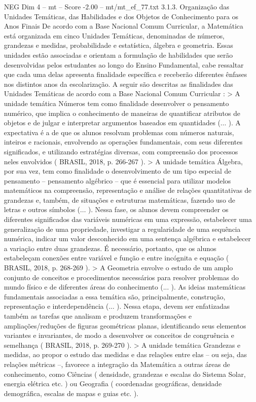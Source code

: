 \begin{textsample}{NEG Dim 4 – mt – Score -2.00 – mt/mt\_ef\_77.txt}  \label{ex:f4_neg_118}
3.1.3.
Organização das Unidades Temáticas, das Habilidades e dos Objetos de Conhecimento para os Anos Finais De acordo com a Base Nacional Comum Curricular, a Matemática está organizada em cinco Unidades Temáticas, denominadas de números, grandezas e medidas, probabilidade e estatística, álgebra e geometria.
Essas unidades estão associadas e orientam a formulação de habilidades que serão desenvolvidas pelos estudantes ao longo do Ensino Fundamental, cabe ressaltar que cada uma delas apresenta finalidade específica e receberão diferentes ênfases nos distintos anos da escolarização.
A seguir são descritas as finalidades das Unidades Temáticas de acordo com a Base Nacional Comum Curricular : > A unidade temática Números tem como finalidade desenvolver o pensamento numérico, que implica o conhecimento de maneiras de quantificar atributos de objetos e de julgar e interpretar argumentos baseados em quantidades (... ).
A expectativa é a de que os alunos resolvam problemas com números naturais, inteiros e racionais, envolvendo as operações fundamentais, com seus diferentes significados, e utilizando estratégias diversas, com compreensão dos processos neles envolvidos ( BRASIL, 2018, p. 266-267 ). > A unidade temática Álgebra, por sua vez, tem como finalidade o desenvolvimento de um tipo especial de pensamento – pensamento algébrico – que é essencial para utilizar modelos matemáticos na compreensão, representação e análise de relações quantitativas de grandezas e, também, de situações e estruturas matemáticas, fazendo uso de letras e outros símbolos (... ).
Nessa fase, os alunos devem compreender os diferentes significados das variáveis numéricas em uma expressão, estabelecer uma generalização de uma propriedade, investigar a regularidade de uma sequência numérica, indicar um valor desconhecido em uma sentença algébrica e estabelecer a variação entre duas grandezas.
É necessário, portanto, que os alunos estabeleçam conexões entre variável e função e entre incógnita e equação ( BRASIL, 2018, p. 268-269 ). > A Geometria envolve o estudo de um amplo conjunto de conceitos e procedimentos necessários para resolver problemas do mundo físico e de diferentes áreas do conhecimento (... ).
As ideias matemáticas fundamentais associadas a essa temática são, principalmente, construção, representação e interdependência (... ).
Nessa etapa, devem ser enfatizadas também as tarefas que analisam e produzem transformações e ampliações/reduções de figuras geométricas planas, identificando seus elementos variantes e invariantes, de modo a desenvolver os conceitos de congruência e semelhança ( BRASIL, 2018, p. 269-270 ). > A unidade temática Grandezas e medidas, ao propor o estudo das medidas e das relações entre elas – ou seja, das relações métricas –, favorece a integração da Matemática a outras áreas de conhecimento, como Ciências ( densidade, grandezas e escalas do Sistema Solar, energia elétrica etc. ) ou Geografia ( coordenadas geográficas, densidade demográfica, escalas de mapas e guias etc. ).

\end{textsample}
